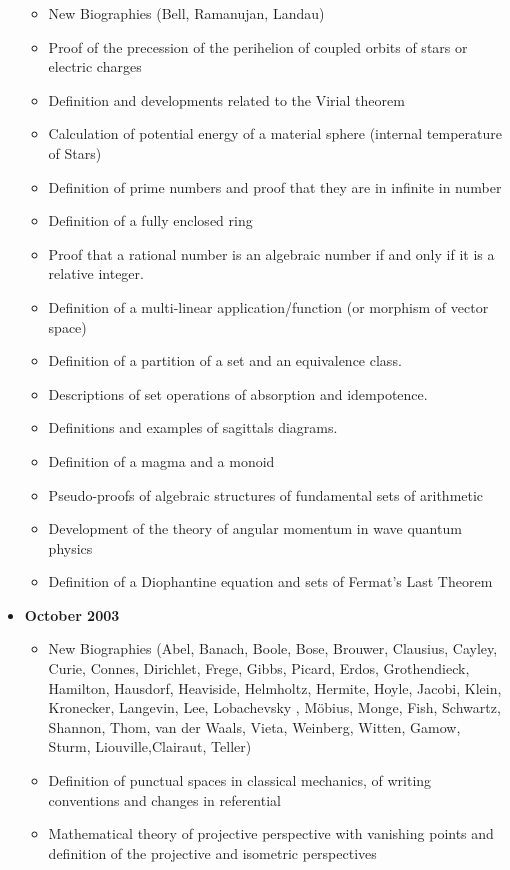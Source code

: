 \documentclass[12pt,a4paper,twoside,openright]{report}
\newcounter{def}
\theoremstyle{definition}
\theoremstyle{itexmp}
\numberwithin{equation}{section}
\begin{document}
\begin{itemize}
		\begin{itemize}[noitemsep]
			\item New Biographies (Bell, Ramanujan, Landau)
			\item Proof of the precession of the perihelion of coupled orbits of stars or electric charges
			\item Definition and developments related to the Virial theorem
			\item Calculation of potential energy of a material sphere (internal temperature of Stars)
			\item Definition of prime numbers and proof that they are in infinite in number
			\item Definition of a fully enclosed ring
			\item Proof that a rational number is an algebraic number if and only if it is a relative integer.
			\item Definition of a multi-linear application/function (or morphism of vector space)
			\item Definition of a partition of a set and an equivalence class.
			\item Descriptions of set operations of absorption and idempotence.
			\item Definitions and examples of sagittals diagrams.
			\item Definition of a magma and a monoid
			\item Pseudo-proofs of algebraic structures of fundamental sets of arithmetic
			\item Development of the theory of angular momentum in wave quantum physics
			\item Definition of a Diophantine equation and sets of Fermat's Last Theorem
		\end{itemize}
	\item \textbf{October 2003}
		\begin{itemize}[noitemsep]
			\item New Biographies (Abel, Banach, Boole, Bose, Brouwer, Clausius, Cayley, Curie,  Connes, Dirichlet, Frege, Gibbs, Picard, Erdos, Grothendieck, Hamilton, Hausdorf,  Heaviside, Helmholtz, Hermite, Hoyle, Jacobi, Klein, Kronecker, Langevin, Lee, Lobachevsky , Möbius, Monge, Fish, Schwartz, Shannon, Thom, van der Waals, Vieta, Weinberg, Witten, Gamow, Sturm, Liouville,Clairaut, Teller)
			\item Definition of punctual spaces in classical mechanics, of writing conventions and changes in referential
			\item Mathematical theory of projective perspective with vanishing points and definition of the projective and isometric perspectives

\end{itemize}
\end{itemize}
\end{document}
